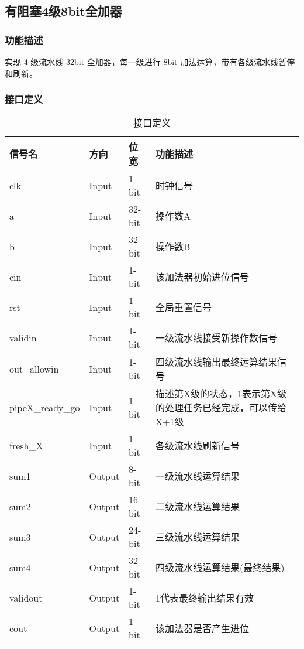 \subsection{有阻塞4级8bit全加器}\label{sub:ctl}

\subsubsection{功能描述}
实现 4 级流水线 32bit 全加器，每一级进行 8bit 加法运算，带有各级流水线暂停和刷新。

\newpage
\subsubsection{接口定义}
\begin{table}[htp]
\caption{接口定义}
\begin{center}
	\begin{tabular}{lllp{8cm}}
	\hline
	\textbf{信号名} & \textbf{方向} & \textbf{位宽} & \textbf{功能描述}\\ \hline
	clk    & Input & 1-bit  & 时钟信号 \\
	a  & Input & 32-bit & 操作数A \\
	b  & Input & 32-bit & 操作数B \\
	cin   & Input & 1-bit  & 该加法器初始进位信号 \\
	rst   & Input & 1-bit  & 全局重置信号 \\
	validin & Input & 1-bit  & 一级流水线接受新操作数信号 \\
	out\_allowin & Input & 1-bit & 四级流水线输出最终运算结果信号 \\
	pipeX\_ready\_go & Input & 1-bit & 描述第X级的状态，1表示第X级的处理任务已经完成，可以传给X+1级\\
	fresh\_X & Input & 1-bit & 各级流水线刷新信号 \\
	sum1 & Output & 8-bit  & 一级流水线运算结果\\
	sum2 & Output & 16-bit & 二级流水线运算结果\\
	sum3 & Output & 24-bit & 三级流水线运算结果\\
	sum4 & Output & 32-bit & 四级流水线运算结果(最终结果)\\
	validout & Output & 1-bit & 1代表最终输出结果有效 \\
	cout & Output & 1-bit  & 该加法器是否产生进位\\
	\hline
	\end{tabular}
\end{center}
\end{table}

